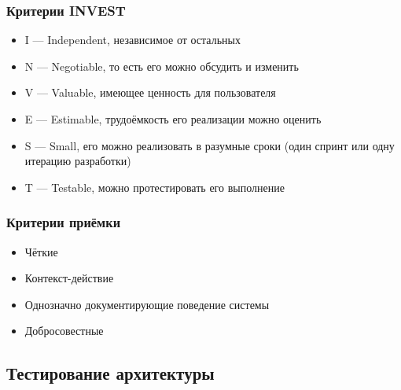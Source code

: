 \documentclass{../../slides-style}
\begin{document}
    \begin{frame}
        \frametitle{Критерии INVEST}
        \begin{itemize}
            \item I --- Independent, независимое от остальных
            \item N --- Negotiable, то есть его можно обсудить и изменить
            \item V --- Valuable, имеющее ценность для пользователя
            \item E --- Estimable, трудоёмкость его реализации можно оценить
            \item S --- Small, его можно реализовать в разумные сроки (один спринт или одну итерацию разработки)
            \item T --- Testable, можно протестировать его выполнение
        \end{itemize}
    \end{frame}

    \begin{frame}
        \frametitle{Критерии приёмки}
        \begin{itemize}
            \item Чёткие
            \item Контекст-действие
            \item Однозначно документирующие поведение системы
            \item Добросовестные
        \end{itemize}
    \end{frame}

    \subsection{Тестирование архитектуры}
\end{document}
